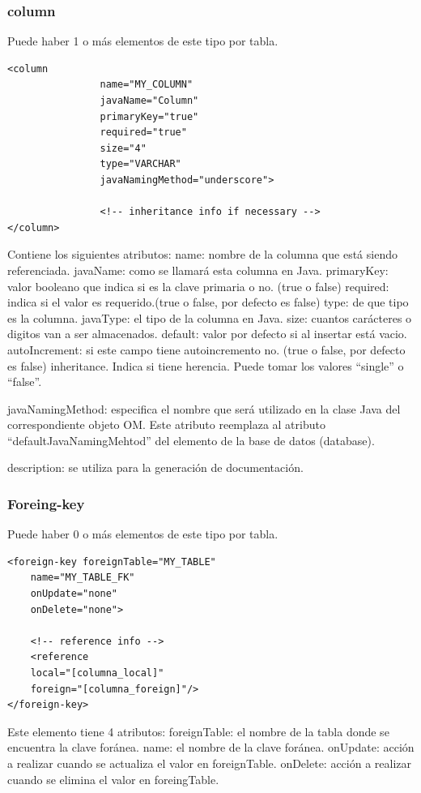 \documentclass[24pt, a4paper, oneside, spanish]{beamer}
\begin{document}
			\begin{frame}
				\frametitle{column}
				
				Puede haber 1 o más elementos de este tipo por tabla.

\begin{lstlisting}
<column
           		name="MY_COLUMN"
           		javaName="Column"
           		primaryKey="true"
           		required="true"
           		size="4"
           		type="VARCHAR"
           		javaNamingMethod="underscore">

           		<!-- inheritance info if necessary -->
</column>
\end{lstlisting}

Contiene los siguientes atributos:
name: nombre de la columna que está siendo referenciada.
javaName: como se llamará esta columna en Java.
primaryKey: valor booleano que indica si es la clave primaria o no. (true o false)
required: indica si el valor es requerido.(true o false, por defecto es false)
type: de que tipo es la columna.
javaType: el tipo de la columna en Java.
size: cuantos carácteres o digitos van a ser almacenados.
default: valor por defecto si al insertar está vacio.
autoIncrement: si este campo tiene autoincremento no. (true o false, por defecto es false)
inheritance. Indica si tiene herencia. Puede tomar los valores “single” o “false”.

javaNamingMethod: especifica el nombre que será utilizado en la clase Java del correspondiente objeto OM. Este atributo reemplaza al atributo “defaultJavaNamingMehtod” del elemento de la base de datos (database).

description: se utiliza para la generación de documentación.

			\end{frame}			
			
			\begin{frame}
				\frametitle{Foreing-key}
				
				Puede haber 0 o más elementos de este tipo por tabla.

\begin{lstlisting}
<foreign-key foreignTable="MY_TABLE"
	name="MY_TABLE_FK"
	onUpdate="none"
	onDelete="none">
	
	<!-- reference info -->
	<reference
	local="[columna_local]"
	foreign="[columna_foreign]"/>
</foreign-key>
\end{lstlisting}

Este elemento tiene 4 atributos:
foreignTable: el nombre de la tabla donde se encuentra la clave foránea.
name: el nombre de la clave foránea.
onUpdate: acción a realizar cuando se actualiza el valor en foreignTable.
onDelete: acción a realizar cuando se elimina el valor en foreingTable.
			\end{frame}
			
\end{document}
